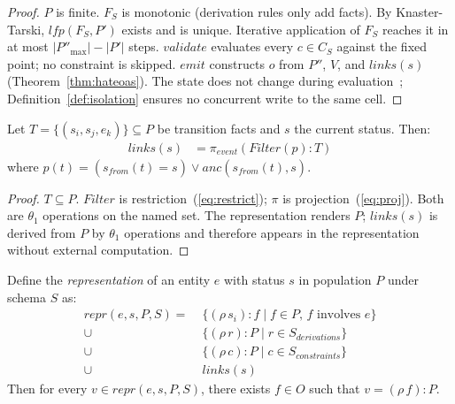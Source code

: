 \documentclass[acmsmall,screen,review]{acmart}
\begin{document}
\begin{proof}
$P$ is finite. $F_S$ is monotonic (derivation rules only add facts). By Knaster-Tarski, $\mathit{lfp}(F_S, P')$ exists and is unique. Iterative application of $F_S$ reaches it in at most $|P''_{\max}| - |P'|$ steps. $\mathit{validate}$ evaluates every $c \in C_S$ against the fixed point; no constraint is skipped. $\mathit{emit}$ constructs $o$ from $P''$, $V$, and $\mathit{links}(s)$ (Theorem~\ref{thm:hateoas}). The state does not change during evaluation~\cite[Sec.\,14.6(c)]{backus78}; Definition~\ref{def:isolation} ensures no concurrent write to the same cell.
\end{proof}

\begin{theorem}\label{thm:hateoas}
Let $T = \{(s_i, s_j, e_k)\} \subseteq P$ be transition facts and $s$ the current status. Then:
\begin{align}
\mathit{links}(s) &= \pi_{\mathit{event}}\!\left(\mathit{Filter}(p) : T\right) \label{eq:hateoas}
\end{align}
where $p(t) = (s_{\mathit{from}}(t) = s) \lor \mathit{anc}(s_{\mathit{from}}(t), s)$.
\end{theorem}

\begin{proof}
$T \subseteq P$. $\mathit{Filter}$ is restriction~(\ref{eq:restrict}); $\pi$ is projection~(\ref{eq:proj}). Both are $\theta_1$ operations on the named set. The representation renders $P$; $\mathit{links}(s)$ is derived from $P$ by $\theta_1$ operations and therefore appears in the representation without external computation.
\end{proof}

\begin{theorem}[Derivability]\label{thm:derive}
Define the \emph{representation} of an entity $e$ with status $s$ in population $P$ under schema $S$ as:
\begin{align*}
\mathit{repr}(e, s, P, S) = \;&\{(\rho\,s_i)\!:\!f \mid f \in P,\, f \text{ involves } e\} \\
\cup\; &\{(\rho\,r)\!:\!P \mid r \in S_{\mathit{derivations}}\} \\
\cup\; &\{(\rho\,c)\!:\!P \mid c \in S_{\mathit{constraints}}\} \\
\cup\; &\mathit{links}(s)
\end{align*}
Then for every $v \in \mathit{repr}(e, s, P, S)$, there exists $f \in O$ such that $v = (\rho\,f)\!:\!P$.
\end{theorem}
\end{document}
